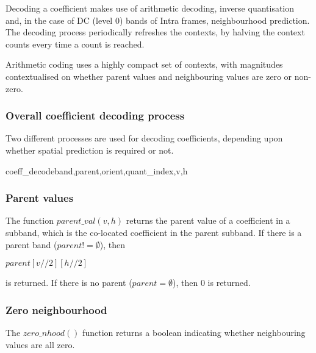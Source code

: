 Decoding a coefficient makes use of arithmetic decoding, inverse quantisation
and, in the case of DC (level 0) bands of Intra frames, neighbourhood prediction.
The decoding process periodically refreshes the contexts, by
halving the context counts every time a count is reached.

Arithmetic coding uses a highly compact set of contexts, 
with magnitudes contextualised on whether parent values
and neighbouring values are zero or non-zero.

\subsubsection{Overall coefficient decoding process}

Two different processes are used for decoding coefficients, depending
upon whether spatial prediction is required or not.

\begin{pseudo}{coeff\_decode}{band,parent,orient,quant\_index,v,h}
\end{pseudo}


\subsubsection{Parent values}
\label{parentval}
The function $parent\_val(v, h)$ returns the parent value of a coefficient in a subband,
which is the co-located coefficient in the parent subband. If there is a parent band 
($parent!=\emptyset$), then

$parent[v//2][h//2]$

is returned. If there is no parent ($parent=\emptyset$), then 0 is returned.

\subsubsection{Zero neighbourhood}
\label{zeronhood}

The $zero\_nhood()$ function returns a boolean indicating whether neighbouring
values are all zero.

